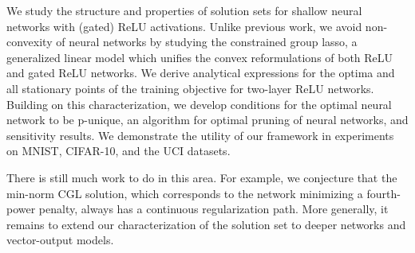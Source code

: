 
We study the structure and properties of solution sets for shallow
neural networks with (gated) ReLU activations.
Unlike previous work, we avoid non-convexity of neural networks
by studying the constrained group lasso,
a generalized linear model which unifies the convex reformulations of both
ReLU and gated ReLU networks.
We derive analytical expressions for the optima and all stationary
points of the training objective for two-layer ReLU networks.
Building on this characterization, we develop
conditions for the optimal neural network to be p-unique,
an algorithm for optimal pruning of neural networks,
and sensitivity results.
We demonstrate the utility of our framework
in experiments on MNIST, CIFAR-10, and the UCI datasets.

There is still much work to do in this area.
For example, we conjecture that the min-norm CGL solution,
which corresponds to the network minimizing a fourth-power penalty,
always has a continuous regularization path.
More generally, it remains to extend our characterization of the solution set to
deeper networks and vector-output models.





